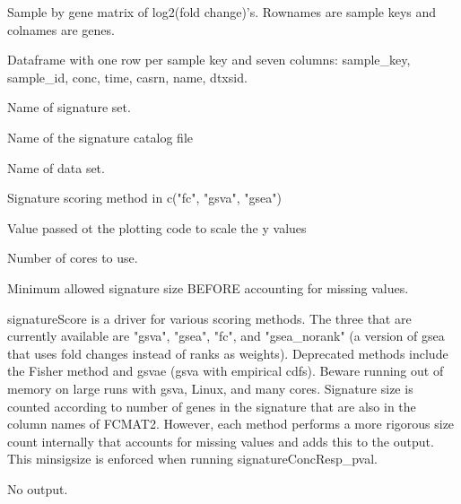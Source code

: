 \documentclass[letterpaper]{book}
\begin{document}
\begin{Arguments}
\begin{ldescription}
\item[\code{FCMAT2}] Sample by gene matrix of log2(fold change)'s. Rownames are
sample keys and colnames are genes.

\item[\code{CHEM\_DICT}] Dataframe with one row per sample key and seven columns:
sample\_key, sample\_id, conc, time, casrn, name, dtxsid.

\item[\code{sigset}] Name of signature set.

\item[\code{sigcatalog}] Name of the signature catalog file

\item[\code{dataset}] Name of data set.

\item[\code{method}] Signature scoring method in c("fc", "gsva", "gsea")

\item[\code{normfactor}] Value passed ot the plotting code to scale the y values

\item[\code{mc.cores}] Number of cores to use.

\item[\code{minsigsize}] Minimum allowed signature size BEFORE accounting for
missing values.
\end{ldescription}
\end{Arguments}
%
\begin{Details}\relax
signatureScore is a driver for various scoring methods. The three that are
currently available are "gsva", "gsea", "fc", and "gsea\_norank" (a version
of gsea that uses fold changes instead of ranks as weights). Deprecated
methods include the Fisher method and gsvae (gsva with empirical cdfs).
Beware running out of memory on large runs with gsva, Linux, and many cores.
Signature size is counted according to number of genes in the signature that are
also in the column names of FCMAT2. However, each method performs a more
rigorous size count internally that accounts for missing values and adds this
to the output. This minsigsize is enforced when running signatureConcResp\_pval.
\end{Details}
%
\begin{Value}
No output.
\end{Value}
\end{document}
